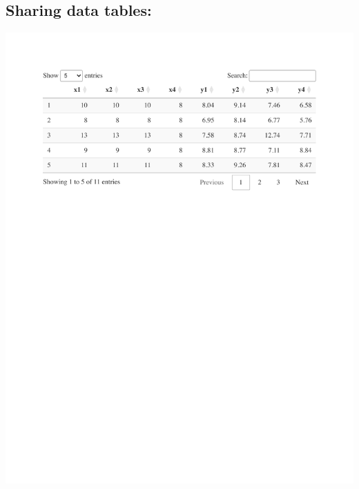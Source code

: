 \documentclass[
  letterpaper,
  DIV=11,
  numbers=noendperiod]{scrreprt}
\theoremstyle{definition}
\theoremstyle{remark}
\begin{document}
\subsection{Sharing data tables:}\label{sharing-data-tables-1}

\includegraphics{answers_files/figure-pdf/tab-anscombe-1.pdf}
\end{document}
